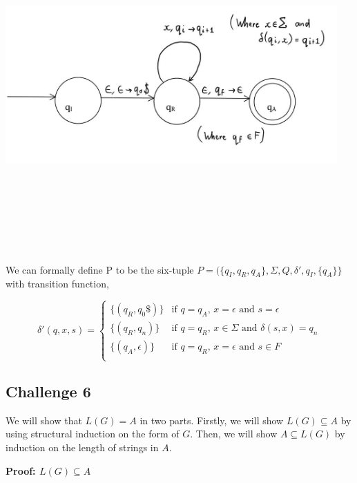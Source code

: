 \documentclass[12pt]{article}
\begin{document}
\begin{center}
\includegraphics[width=5in,height=5in,keepaspectratio]{Q5-PDA.jpg}
\end{center}

\noindent
We can formally define P to be the six-tuple $P=(\{q_I, q_R, q_A\}, \Sigma, Q, \delta', q_I, \{q_A\}\}$
with transition function,

\[
  \delta'(q, x, s) =
  \begin{cases}
  	\{(q_R, q_0\$)\}   & \text{if $q=q_A$, $x=\epsilon$ and $s=\epsilon$} \\
      \{(q_R, q_n)\}        & \text{if $q=q_R$, $x \in \Sigma$ and $\delta (s, x)=q_n$} \\
      \{(q_A, \epsilon)\} & \text{if $q=q_R$, $x=\epsilon$ and $s \in F$} \\
  \end{cases}
\]
\bigskip

\subsection*{Challenge 6}
We will show that $L(G) = A$ in two parts. Firstly, we will show $L(G) \subseteq A$ by using structural induction
on the form of $G$. Then, we will show $A \subseteq L(G)$ by induction on the length of strings in $A$.

\bigskip
\noindent
\textbf{Proof: $L(G) \subseteq A$}
\end{document}
